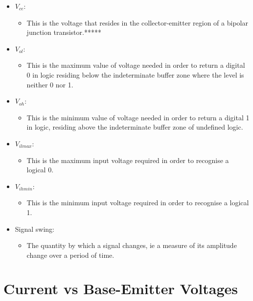 \documentclass[12pt]{article}
\begin{document}
\begin{itemize}
\begin{itemize}
\end{itemize}
\item $V_{ce}$:
\begin{itemize}
\item This is the voltage that resides in the collector-emitter region of a bipolar junction transistor.*****
\end{itemize}
\item $V_{ol}$:
\begin{itemize}
\item This is the maximum value of voltage needed in order to return a digital 0 in logic residing below the indeterminate buffer zone where the level is neither 0 nor 1.
\end{itemize}
\item $V_{oh}$:
\begin{itemize}
\item This is the minimum value of voltage needed in order to return a digital 1 in logic, residing above the indeterminate buffer zone of undefined logic.
\end{itemize}
\item $V_{il max}$:
\begin{itemize}
\item This is the maximum input voltage required in order to recognise a logical 0.
\end{itemize}
\item $V_{ih min}$:
\begin{itemize}
\item This is the minimum input voltage required in order to recognise a logical 1.
\end{itemize}
\item Signal swing:
\begin{itemize}
\item The quantity by which a signal changes, ie a measure of its amplitude change over a period of time.
\end{itemize}
\end{itemize}

\section{Current vs Base-Emitter Voltages}
\end{document}
